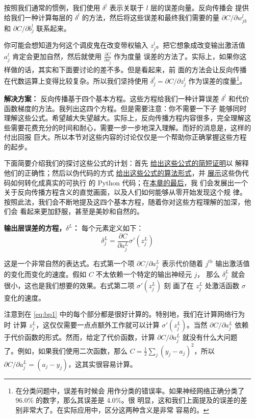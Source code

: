 按照我们通常的惯例，我们使用 $\delta^l$ 表示关联于 $l$ 层的误差向量。反向传播会
提供给我们一种计算每层的 $\delta^l$ 的方法，然后将这些误差和最终我们需要的量
$\partial C/\partial w_{jk}^l$ 和 $\partial C/\partial b_j^l$ 联系起来。

你可能会想知道为何这个调皮鬼在改变带权输入 $z_j^l$。把它想象成改变输出激活值
$a_j^l$ 肯定会更加自然，然后就使用 $\frac{\partial C}{\partial a_j^l}$ 作为度量
误差的方法了。实际上，如果你这样做的话，其实和下面要讨论的差不多。但是看起来，前
面的方法会让反向传播在代数运算上变得比较复杂。所以我们坚持使用 $\delta_j^l =
\partial C / \partial z_j^l$ 作为误差的度量\footnote{在分类问题中，误差有时候会
  用作分类的错误率。如果神经网络正确分类了 96.0\% 的数字，那么其误差是 4.0\%。很
  明显，这和我们上面提及的误差的差别非常大了。在实际应用中，区分这两种含义是非常
  容易的。}。

\textbf{解决方案：} 反向传播基于四个基本方程。这些方程给我们一种计算误差
$\delta^l$ 和代价函数梯度的方法。我列出这四个方程。但是需要注意：你不需要一下子
能够同时理解这些公式。希望越大失望越大。实际上，反向传播方程内容很多，完全理解这
些需要花费充分的时间和耐心，需要一步一步地深入理解。而好的消息是，这样的付出回报
巨大。所以本节对这些内容的讨论仅仅是一个帮助你正确掌握这些方程的起步。

下面简要介绍我们的探讨这些公式的计划：首先%
\hyperref[sec:proof_of_the_four_fundamental_equations]{给出这些公式的简短证明}以
解释他们的正确性；然后以伪代码的方式%
\hyperref[sec:the_backpropagation_algorithm]{给出这些公式的算法形式}，并%
\hyperref[sec:the_code_for_backpropagation]{展示}这些伪代码如何转化成真实的可执行
的 Python 代码；在\hyperref[sec:backpropagation_the_big_picture]{本章的最后}，我
们会发展出一个关于反向传播方程含义的直觉画面，以及人们如何能够从零开始发现这个规
律。按照此法，我们会不断地提及这四个基本方程，随着你对这些方程理解的加深，他们会
看起来更加舒服，甚至是美妙和自然的。

\textbf{输出层误差的方程，$\delta^L$：} 每个元素定义如下：
\begin{equation}
  \delta^L_j = \frac{\partial C}{\partial a^L_j} \sigma'(z^L_j)
  \label{eq:bp1}\tag{BP1}
\end{equation}

这是一个非常自然的表达式。右式第一个项 $\partial C/\partial a_j^L$ 表示代价随着
$j^{th}$ 输出激活值的变化而变化的速度。假如 $C$ 不太依赖一个特定的输出神经元 $j$，
那么 $\delta_j^L$ 就会很小，这也是我们想要的效果。右式第二项 $\sigma'(z_j^L)$ 刻
画了在 $z_j^L$ 处激活函数 $\sigma$ 变化的速度。

注意到在 \eqref{eq:bp1} 中的每个部分都是很好计算的。特别地，我们在计算网络行为时
计算 $z_j^L$，这仅仅需要一点点额外工作就可以计算 $\sigma'(z_j^L)$。当然
$\partial C/\partial a_j^L$ 依赖于代价函数的形式。然而，给定了代价函数，计算
$\partial C/\partial a_j^L$ 就没有什么大问题了。例如，如果我们使用二次函数，那么
$C = \frac{1}{2} \sum_j(y_j-a_j)^2$，所以 $\partial C/\partial a_j^L = (a_j -
y_j)$，这其实很容易计算。

